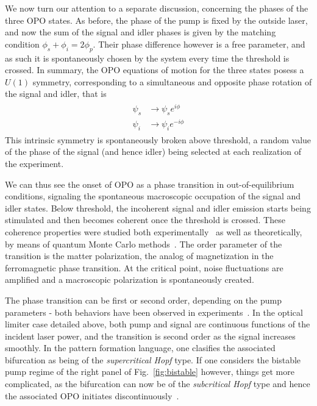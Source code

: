 We now turn our attention to a separate discussion, concerning the
phases of the three OPO states.  As before, the phase of the pump is
fixed by the outside laser, and now the sum of the signal and idler
phases is given by the matching condition
$\phi_s + \phi_i = 2 \phi_p$. Their phase difference however is a
free parameter, and as such it is spontaneously chosen by the system
every time the threshold is crossed. In summary, the OPO equations of
motion for the three states posess a $U(1)$ symmetry, corresponding to
a simultaneous and opposite phase rotation of the signal and idler,
that is
%
\begin{align}
  \begin{split}
    \psi_s& \rightarrow \psi_s e^{i \phi} \\
    \psi_i & \rightarrow \psi_i e^{-i \phi}
  \end{split}
\end{align}
%
This intrinsic symmetry is spontaneously broken above threshold, a
random value of the phase of the signal (and hence idler) being
selected at each realization of the experiment. 

We can thus see the onset of OPO as a phase transition in
out-of-equilibrium conditions, signaling the spontaneous macroscopic
occupation of the signal and idler states. Below threshold, the
incoherent signal and idler emission starts being stimulated and then
becomes coherent once the threshold is crossed. These coherence
properties were studied both experimentally~\cite{Baas2006} as well as
theoretically, by means of quantum Monte Carlo
methods~\cite{Carusotto2005}. The order parameter of the transition is
the matter polarization, the analog of magnetization in the
ferromagnetic phase transition. At the critical point, noise
fluctuations are amplified and a macroscopic polarization is
spontaneously created. 

The phase transition can be first or second order, depending on the
pump parameters - both behaviors have been observed in
experiments~\cite{Baumberg_2000,Dasbach2005,Baas2004}. In the optical
limiter case detailed above, both pump and signal are continuous
functions of the incident laser power, and the transition is second
order as the signal increases smoothly. In the pattern formation
language, one clasifies the associated bifurcation as being of the
\textit{supercritical Hopf} type. If one considers the bistable pump
regime of the right panel of Fig.~\ref{fig:bistable} however, things
get more complicated, as the bifurcation can now be of the
\textit{subcritical Hopf} type and hence the associated OPO initiates
discontinuously~\cite{Wouters_2007_b}. 

